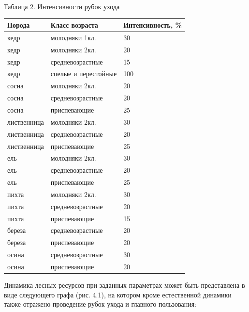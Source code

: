 \documentclass{article}
\begin{document}
\begin{flushright}
Таблица 2. Интенсивности рубок ухода

\begin{tabular}{|>{\raggedright}p{104pt}|>{\raggedright}p{155pt}|>{\raggedright}p{115pt}|}
\hline
Порода & Класс возраста & Интенсивность, \%\tabularnewline
\hline
кедр & молодняки 1кл. & 30\tabularnewline
\hline
кедр & молодняки 2кл. & 20\tabularnewline
\hline
кедр & средневозрастные & 15\tabularnewline
\hline
кедр & спелые и перестойные & 100\tabularnewline
\hline
сосна & молодняки 2кл. & 20\tabularnewline
\hline
сосна & средневозрастные & 20\tabularnewline
\hline
сосна & приспевающие & 25\tabularnewline
\hline
лиственница & молодняки 2кл. & 30\tabularnewline
\hline
лиственница & средневозрастные & 20\tabularnewline
\hline
лиственница & приспевающие & 25\tabularnewline
\hline
ель & молодняки 2кл. & 30\tabularnewline
\hline
ель & средневозрастные & 20\tabularnewline
\hline
ель & приспевающие & 25\tabularnewline
\hline
пихта & молодняки 2кл. & 30\tabularnewline
\hline
пихта & средневозрастные & 20\tabularnewline
\hline
пихта & приспевающие & 15\tabularnewline
\hline
береза & средневозрастные & 20\tabularnewline
\hline
береза & приспевающие & 20\tabularnewline
\hline
осина & средневозрастные & 30\tabularnewline
\hline
осина & приспевающие & 20\tabularnewline
\hline
\end{tabular}
\end{flushright}

Динамика лесных ресурсов при заданных параметрах 
может быть представлена в виде следующего графа 
(рис. 4.1), на котором кроме естественной динамики 
также отражено проведение рубок ухода и главного 
пользования:
\end{document}
